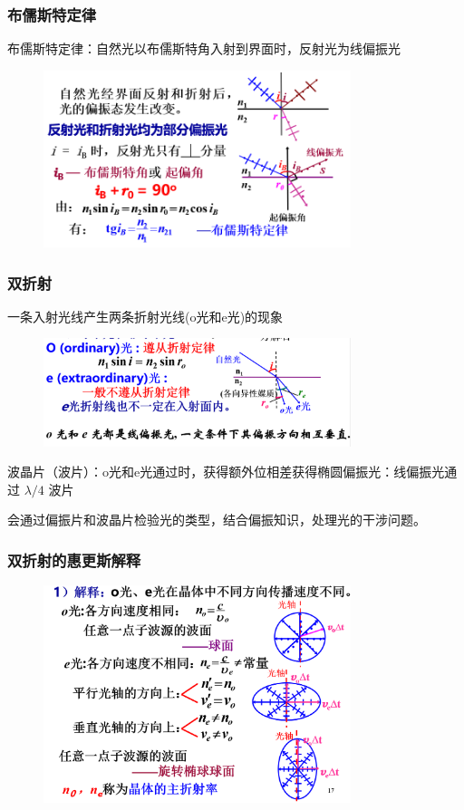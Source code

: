 \documentclass[UTF8]{ctexbeamer}
\begin{document}
\begin{frame}
	\frametitle{布儒斯特定律}

	布儒斯特定律：自然光以布儒斯特角入射到界面时，反射光为线偏振光
	\begin{figure}[!ht]
	\centering
	\includegraphics[width=0.8\textwidth]{29}
\end{figure}	

\end{frame}
\begin{frame}
	\frametitle{双折射}
一条入射光线产生两条折射光线(o光和e光)的现象
	\begin{figure}[!ht]
	\centering
	\includegraphics[width=0.8\textwidth]{33}
\end{figure}		
	波晶片（波片）：o光和e光通过时，获得额外位相差获得椭圆偏振光：线偏振光通过 $\lambda / 4$ 波片
	
	会通过偏振片和波晶片检验光的类型，结合偏振知识，处理光的干涉问题。
\end{frame}
\begin{frame}
	\frametitle{双折射的惠更斯解释}
	\begin{figure}[!ht]
		\centering
		\includegraphics[width=0.8\textwidth]{34}
	\end{figure}		
	
\end{frame}
\end{document}
